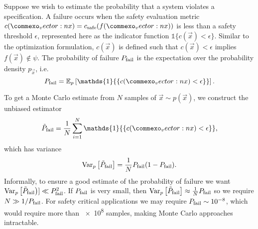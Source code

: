Suppose we wish to estimate the probability that a system violates a specification. A failure occurs when the safety evaluation metric $c(\vec{x}) = c_{\rm safe}(f(\vec{x}))$ is less than a safety threshold $\epsilon$, represented here as the indicator function $\mathds{1}{\{ c(\vec{x}) < \epsilon \}}$. Similar to the optimization formulation, $c(\vec{x})$ is defined such that $c(\vec{x}) < \epsilon$ implies $f(\vec{x}) \not \in \psi$. The probability of failure $P_{\rm fail}$ is the expectation over the probability density $p_{\vec{x}}$, i.e.
\begin{equation}
    P_{\rm fail} = \mathbb{E}_{p}\left[ \mathds{1}{\{ c(\vec{x}) < \epsilon \}} \right] \text{.}
\end{equation} 

To get a Monte Carlo estimate from $N$ samples of $\vec{x} \sim p(\vec{x})$, we construct the unbiased estimator
\begin{equation}
    \tilde{P}_{\rm fail} = \frac{1}{N} \sum_{i=1}^N \mathds{1}{\{ c(\vec{x}) < \epsilon \}} \text{,}
\end{equation}
which has variance
\begin{equation}
    \text{Var}_p\left[ \tilde{P}_{\rm fail} \right] = \frac{1}{N} P_{\rm fail}(1-P_{\rm fail}) \text{.}
\end{equation}
Informally, to ensure a good estimate of the probability of failure we want $\text{Var}_p\left[ \tilde{P}_{\rm fail} \right)]\ll P_{\rm fail}^2$. If $P_{\rm fail}$ is very small, then $\text{Var}_p\left[ \tilde{P}_{\rm fail} \right] \approx \frac{1}{N}P_{\rm fail}$ so we require $N \gg 1 / P_{\rm fail}$. For safety critical applications we may require $P_{\rm fail} \sim \num{e-8}$, which would require more than \num{e8} samples, making Monte Carlo approaches intractable.

